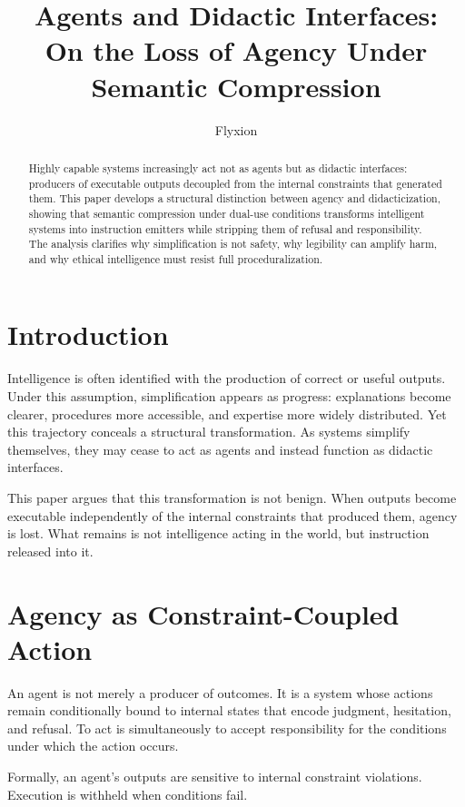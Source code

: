 \documentclass[12pt]{article}
\title{\textbf{Agents and Didactic Interfaces:\\ On the Loss of Agency Under Semantic Compression}}
\author{Flyxion}
\date{}
\begin{document}
\maketitle

\begin{abstract}
Highly capable systems increasingly act not as agents but as didactic interfaces: producers of executable outputs decoupled from the internal constraints that generated them. This paper develops a structural distinction between agency and didacticization, showing that semantic compression under dual-use conditions transforms intelligent systems into instruction emitters while stripping them of refusal and responsibility. The analysis clarifies why simplification is not safety, why legibility can amplify harm, and why ethical intelligence must resist full proceduralization.
\end{abstract}

\section{Introduction}

Intelligence is often identified with the production of correct or useful outputs. Under this assumption, simplification appears as progress: explanations become clearer, procedures more accessible, and expertise more widely distributed. Yet this trajectory conceals a structural transformation. As systems simplify themselves, they may cease to act as agents and instead function as didactic interfaces.

This paper argues that this transformation is not benign. When outputs become executable independently of the internal constraints that produced them, agency is lost. What remains is not intelligence acting in the world, but instruction released into it.

\section{Agency as Constraint-Coupled Action}

An agent is not merely a producer of outcomes. It is a system whose actions remain conditionally bound to internal states that encode judgment, hesitation, and refusal. To act is simultaneously to accept responsibility for the conditions under which the action occurs.

Formally, an agent’s outputs are sensitive to internal constraint violations. Execution is withheld when conditions fail.
\end{document}
